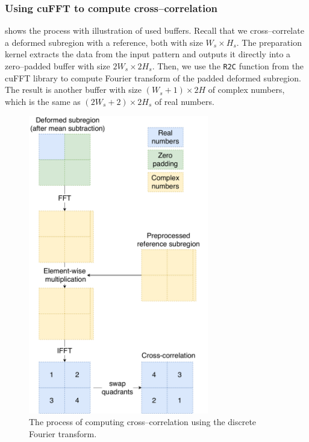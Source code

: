 \subsubsection{Using cuFFT to compute cross--correlation}

 shows the process with illustration of used buffers. Recall that we cross--correlate a deformed subregion with a reference, both with size $W_s \times H_s$. The preparation kernel extracts the data from the input pattern and outputs it directly into a zero--padded buffer with size $2W_s \times 2H_s$. Then, we use the \texttt{R2C} function from the cuFFT library to compute Fourier transform of the padded deformed subregion. The result is another buffer with size $(W_s + 1) \times 2H$ of complex numbers, which is the same as $(2W_s+2) \times 2H_s$ of real numbers.

\begin{figure}
	\centering
	\includegraphics[width=0.7\textwidth]{img/fft-impl}
	\caption{The process of computing cross--correlation using the discrete Fourier transform.}
	\label{fft-impl}
\end{figure}

